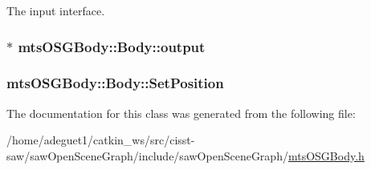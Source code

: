 The input interface. 

\hypertarget{classmts_o_s_g_body_1_1_body_a811a794749b145589bf15a97719166a7}{
\subsubsection[{output}]{$\ast$ mts\-O\-S\-G\-Body\-::\-Body\-::output}}\label{classmts_o_s_g_body_1_1_body_a811a794749b145589bf15a97719166a7}
\hypertarget{classmts_o_s_g_body_1_1_body_a840993fc4f30facfdf722b7f0df04869}{
\subsubsection[{Set\-Position}]{ mts\-O\-S\-G\-Body\-::\-Body\-::\-Set\-Position}}\label{classmts_o_s_g_body_1_1_body_a840993fc4f30facfdf722b7f0df04869}


The documentation for this class was generated from the following file\-:\begin{DoxyCompactItemize}
\item 
/home/adeguet1/catkin\-\_\-ws/src/cisst-\/saw/saw\-Open\-Scene\-Graph/include/saw\-Open\-Scene\-Graph/\hyperlink{mts_o_s_g_body_8h}{mts\-O\-S\-G\-Body.\-h}\end{DoxyCompactItemize}
